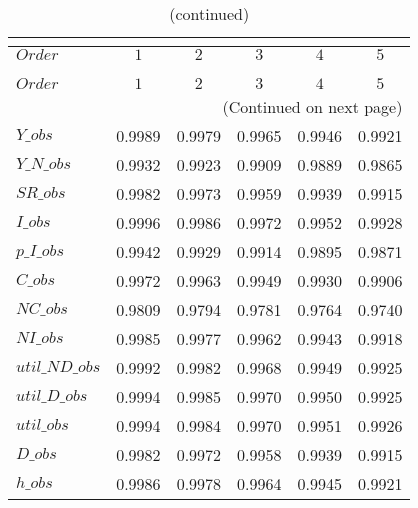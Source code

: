  
\begin{center}
\begin{longtable}{lccccc} 
\caption{COEFFICIENTS OF AUTOCORRELATION}\\
 \label{Table:th_autocorr_matrix}\\
\toprule 
$Order          $	 & 	 $         1$	 & 	 $         2$	 & 	 $         3$	 & 	 $         4$	 & 	 $         5$\\
\midrule \endfirsthead 
\caption{(continued)}\\
 \toprule \\ 
$Order          $	 & 	 $         1$	 & 	 $         2$	 & 	 $         3$	 & 	 $         4$	 & 	 $         5$\\
\midrule \endhead 
\midrule \multicolumn{6}{r}{(Continued on next page)} \\ \bottomrule \endfoot 
\bottomrule \endlastfoot 
$Y\_obs         $	 & 	    0.9989	 & 	    0.9979	 & 	    0.9965	 & 	    0.9946	 & 	    0.9921 \\ 
$Y\_N\_obs      $	 & 	    0.9932	 & 	    0.9923	 & 	    0.9909	 & 	    0.9889	 & 	    0.9865 \\ 
$SR\_obs        $	 & 	    0.9982	 & 	    0.9973	 & 	    0.9959	 & 	    0.9939	 & 	    0.9915 \\ 
$I\_obs         $	 & 	    0.9996	 & 	    0.9986	 & 	    0.9972	 & 	    0.9952	 & 	    0.9928 \\ 
$p\_I\_obs      $	 & 	    0.9942	 & 	    0.9929	 & 	    0.9914	 & 	    0.9895	 & 	    0.9871 \\ 
$C\_obs         $	 & 	    0.9972	 & 	    0.9963	 & 	    0.9949	 & 	    0.9930	 & 	    0.9906 \\ 
$NC\_obs        $	 & 	    0.9809	 & 	    0.9794	 & 	    0.9781	 & 	    0.9764	 & 	    0.9740 \\ 
$NI\_obs        $	 & 	    0.9985	 & 	    0.9977	 & 	    0.9962	 & 	    0.9943	 & 	    0.9918 \\ 
$util\_ND\_obs  $	 & 	    0.9992	 & 	    0.9982	 & 	    0.9968	 & 	    0.9949	 & 	    0.9925 \\ 
$util\_D\_obs   $	 & 	    0.9994	 & 	    0.9985	 & 	    0.9970	 & 	    0.9950	 & 	    0.9925 \\ 
$util\_obs      $	 & 	    0.9994	 & 	    0.9984	 & 	    0.9970	 & 	    0.9951	 & 	    0.9926 \\ 
$D\_obs         $	 & 	    0.9982	 & 	    0.9972	 & 	    0.9958	 & 	    0.9939	 & 	    0.9915 \\ 
$h\_obs         $	 & 	    0.9986	 & 	    0.9978	 & 	    0.9964	 & 	    0.9945	 & 	    0.9921 \\ 
\end{longtable}
 \end{center}
